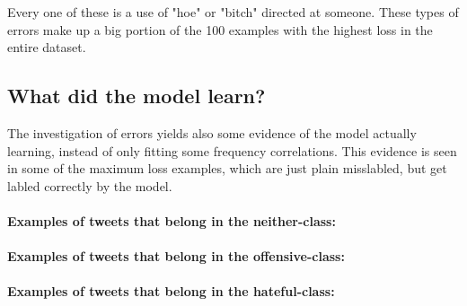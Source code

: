 \documentclass[11pt,a4paper]{article}
\begin{document}
Every one of these is a use of "hoe" or "bitch" directed at someone.
These types of errors make up a big portion of the 100 examples with the highest loss in the entire dataset.

\subsection{What did the model learn?}
The investigation of errors yields also some evidence of the model actually learning, instead of only fitting some
frequency correlations. 
This evidence is seen in some of the maximum loss examples, which are just plain misslabled, but get labled correctly by the model.

\paragraph{Examples of tweets that belong in the neither-class:}
\begin{center}
\newline
{}\newline
{}\newline
{}\newline
{}\newline
\end{center}

\paragraph{Examples of tweets that belong in the offensive-class:}
\begin{center}
\newline
{}\newline
\end{center}

\paragraph{Examples of tweets that belong in the hateful-class:}
\begin{center}
\newline
\end{center}
\end{document}
